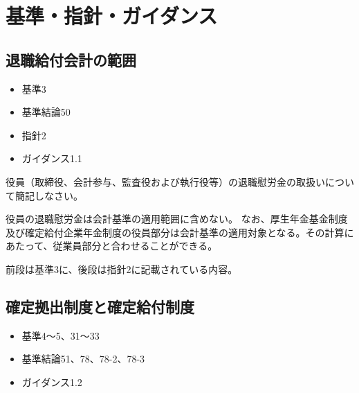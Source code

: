 \section{基準・指針・ガイダンス}

\subsection{退職給付会計の範囲}

\begin{InyouJobunbox}
  \begin{itemize}
    \item 基準3
    \item 基準結論50
    \item 指針2
    \item ガイダンス1.1
  \end{itemize}
\end{InyouJobunbox}


\begin{shortanswer}[年金2 \ 2018 \ 問題2(2)\textcircled{3}]
  役員（取締役、会計参与、監査役および執行役等）の退職慰労金の取扱いについて簡記しなさい。
\end{shortanswer}

\begin{answerbox}
役員の退職慰労金は会計基準の適用範囲に含めない。
なお、厚生年金基金制度及び確定給付企業年金制度の役員部分は会計基準の適用対象となる。その計算にあたって、従業員部分と合わせることができる。
\end{answerbox}

\begin{explanationbox}
前段は基準3に、後段は指針2に記載されている内容。
\end{explanationbox}

\newpage

\subsection{確定拠出制度と確定給付制度}

\begin{InyouJobunbox}
  \begin{itemize}
    \item 基準4〜5、31〜33
    \item 基準結論51、78、78-2、78-3
    \item ガイダンス1.2
  \end{itemize}
\end{InyouJobunbox}

